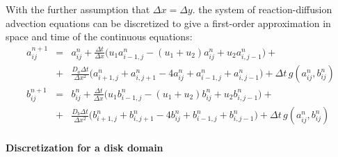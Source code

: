 \documentclass[11pt]{article}
\begin{document}
\noindent With the further assumption that $\Delta x = \Delta y$. the system of reaction-diffusion advection equations can be discretized to give a first-order approximation in space and time of the continuous equations:
\begin{eqnarray*}
a^{n+1}_{ij} &=& a^n_{ij} + \frac{\Delta t}{\Delta x} \Big( u_1 a^n_{i-1,j} - (u_1+u_2) a^n_{ij} + u_2 a^n_{i,j-1} \Big) + \\  
	&+& \frac{D_a \Delta t}{\Delta x^2} \Big( a^n_{i+1,j} + a^n_{i,j+1} - 4 a^n_{ij} + a^n_{i-1,j} + a^n_{i,j-1} \Big) + \Delta t \, g(a^n_{ij},b^n_{ij})\\ 
b^{n+1}_{ij} &=& b^n_{ij} + \frac{\Delta t}{\Delta x} \Big( u_1 b^n_{i-1,j} - (u_1+u_2) b^n_{ij} + u_2 b^n_{i,j-1} \Big) + \\  
	&+& \frac{D_b \Delta t}{\Delta x^2} \Big( b^n_{i+1,j} + b^n_{i,j+1} - 4 b^n_{ij} + b^n_{i-1,j} + b^n_{i,j-1} \Big) + \Delta t \, g(a^n_{ij},b^n_{ij})\\ 
\end{eqnarray*}

\noindent \textbf{Discretization for a disk domain}
\end{document}
